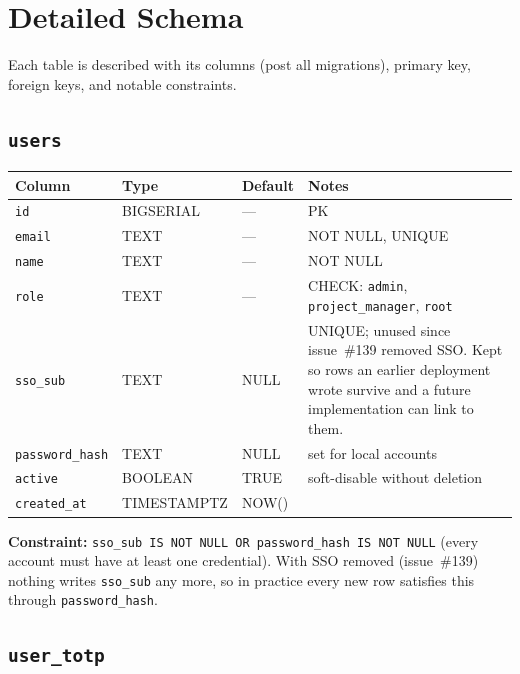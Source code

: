 \documentclass[12pt,a4paper,twoside]{report}
\newcommand{\code}[1]{\texttt{#1}}
\begin{document}
\section{Detailed Schema}
\label{sec:schema-detail}

Each table is described with its columns (post all migrations), primary
key, foreign keys, and notable constraints.

\subsection*{\texttt{users}}

\begin{table}[H]
  \centering\small
  \begin{tabular}{@{}llll@{}}
    \toprule
    \textbf{Column} & \textbf{Type} & \textbf{Default} & \textbf{Notes} \\
    \midrule
    \code{id}            & BIGSERIAL & --- & PK \\
    \code{email}         & TEXT      & --- & NOT NULL, UNIQUE \\
    \code{name}          & TEXT      & --- & NOT NULL \\
    \code{role}          & TEXT      & --- & CHECK: \code{admin}, \code{project\_manager}, \code{root} \\
    \code{sso\_sub}      & TEXT      & NULL & UNIQUE; unused since issue~\#139 removed SSO. Kept so rows an earlier deployment wrote survive and a future implementation can link to them. \\
    \code{password\_hash}& TEXT      & NULL & set for local accounts \\
    \code{active}        & BOOLEAN   & TRUE & soft-disable without deletion \\
    \code{created\_at}   & TIMESTAMPTZ & NOW() & \\
    \bottomrule
  \end{tabular}
\end{table}

\noindent\textbf{Constraint:} \code{sso\_sub IS NOT NULL OR password\_hash IS NOT NULL}
(every account must have at least one credential). With SSO removed
(issue~\#139) nothing writes \code{sso\_sub} any more, so in practice every new
row satisfies this through \code{password\_hash}.

\subsection*{\texttt{user\_totp}}
\end{document}
